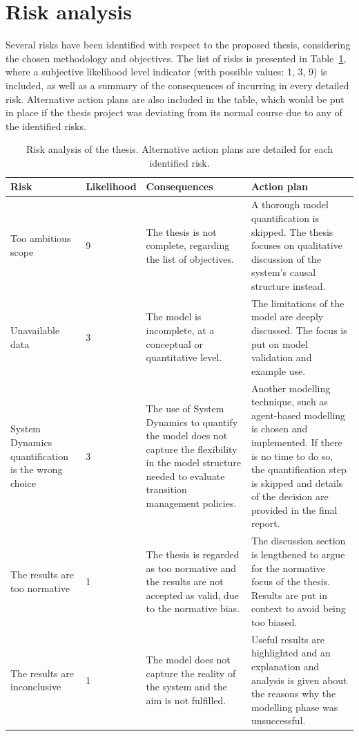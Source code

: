 \documentclass[a4paper,fontsize=11pt,bibliography=totoc]{scrartcl}
\newcommand{\tref}[1]{Table~\ref{#1}}
\begin{document}
\section{Risk analysis}
Several risks have been identified with respect to the proposed thesis, considering the chosen methodology and objectives. The list of risks is presented in \tref{t:risks}, where a subjective likelihood level indicator (with possible values: 1, 3, 9) is included, as well as a summary of the consequences of incurring in every detailed risk. Alternative action plans are also included in the table, which would be put in place if the thesis project was deviating from its normal course due to any of the identified risks.
%
\begin{table}[h!]
\centering
\footnotesize
\caption{Risk analysis of the thesis. Alternative action plans are detailed for each identified risk.}
\label{t:risks}
\begin{tabular}{p{2.5cm}p{1.5cm}p{4.5cm}p{4.5cm}}
\toprule
Risk & Likelihood & Consequences & Action plan \\
\midrule
Too ambitious scope & 9 & The thesis is not complete, regarding the list of objectives. & A thorough model quantification is skipped. The thesis focuses on qualitative discussion of the system's causal structure instead. \\[0.5em]
Unavailable data & 3 & The model is incomplete, at a conceptual or quantitative level. & The limitations of the model are deeply discussed. The focus is put on model validation and example use. \\[0.5em]
System Dynamics quantification is the wrong choice & 3 & The use of System Dynamics to quantify the model does not capture the flexibility in the model structure needed to evaluate transition management policies. & Another modelling technique, such as agent-based modelling is chosen and implemented. If there is no time to do so, the quantification step is skipped and details of the decision are provided in the final report. \\[0.5em]
The results are too normative & 1 & The thesis is regarded as too normative and the results are not accepted as valid, due to the normative bias. & The discussion section is lengthened to argue for the normative focus of the thesis. Results are put in context to avoid being too biased. \\[0.5em]
The results are inconclusive & 1 & The model does not capture the reality of the system and the aim is not fulfilled. & Useful results are highlighted and an explanation and analysis is given about the reasons why the modelling phase was unsuccessful. \\
\bottomrule
\end{tabular}
\end{table}

\clearpage
\printbibliography
\end{document}
